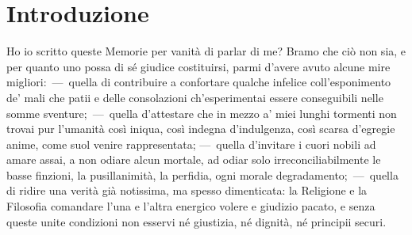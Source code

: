 
\chapter*{Introduzione}

Ho io scritto queste Memorie per vanità di parlar di me? Bramo che ciò non
sia, e per quanto uno possa di sé giudice costituirsi, parmi d'avere avuto
alcune mire migliori:~---~quella di contribuire a confortare qualche infelice
coll'esponimento de' mali che patii e delle consolazioni ch'esperimentai
essere conseguibili nelle somme sventure;~---~quella d'attestare che in mezzo
a' miei lunghi tormenti non trovai pur l'umanità così iniqua, così indegna
d'indulgenza, così scarsa d'egregie anime, come suol venire rappresentata;
---~quella d'invitare i cuori nobili ad amare assai, a non odiare alcun
mortale, ad odiar solo irreconciliabilmente le basse finzioni, la
pusillanimità, la perfidia, ogni morale degradamento;~---~quella di ridire
una verità già notissima, ma spesso dimenticata: la Religione e la
Filosofia comandare l'una e l'altra energico volere e giudizio pacato, e
senza queste unite condizioni non esservi né giustizia, né dignità, né
principii securi.
